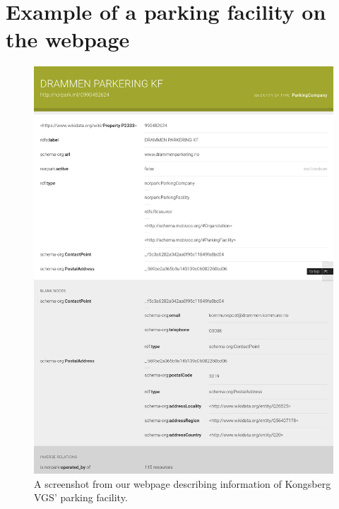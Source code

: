 \chapter{Example of a parking facility on the webpage}
\label{appendix:webpage}
\begin{figure}[H]
	\centering
	\includegraphics[scale=0.22]{figures/parking-company-screenshot.png}
	\caption{A screenshot from our webpage describing information of Kongsberg VGS' parking facility.}
\end{figure}

